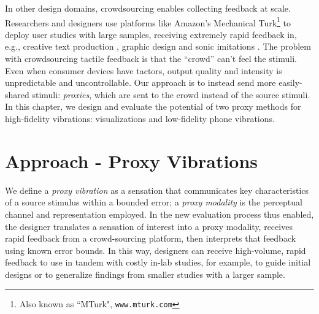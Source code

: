  In other design domains, crowdsourcing  enables collecting feedback at scale.
    Researchers and designers use platforms like Amazon's Mechanical Turk\footnote{Also known as ``MTurk", \texttt{www.mturk.com}} to deploy user studies with large samples, receiving extremely rapid feedback in, e.g., creative text production \cite{Siangliulue2015}, graphic design \cite{Xu2014} and sonic imitations \cite{Cartwright2015}.
    The  problem with crowdsourcing tactile feedback is that the ``crowd''  can't feel the stimuli.
    Even when consumer devices have tactors,  output quality and intensity is unpredictable and uncontrollable.
Our approach is to instead send more easily-shared stimuli: \emph{proxies}, which are sent to the crowd instead of the source stimuli.
In this chapter, we design and evaluate the potential of two proxy methods for high-fidelity vibrations: visualizations and low-fidelity phone vibrations.



%


\section{Approach - Proxy Vibrations}
    We define a \emph{proxy vibration} as a sensation that communicates key characteristics of a source stimulus within a bounded error; a \emph{proxy modality} is the perceptual channel and representation employed.
    In the new evaluation process thus enabled,  the designer translates a sensation of interest into a proxy modality, receives rapid feedback from a crowd-sourcing platform, then interprets that feedback using known error bounds.
   In this way, designers can receive high-volume, rapid feedback to use in tandem with costly in-lab studies, for example, to guide initial designs or to generalize findings from smaller studies with a larger sample.
   
